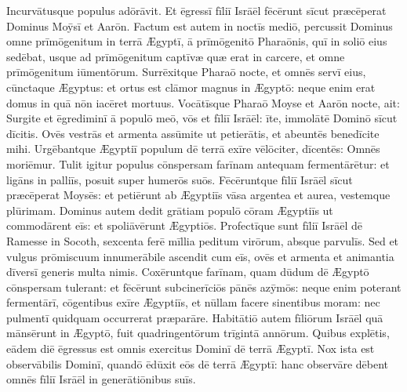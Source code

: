 Incurvātusque populus adōrāvit. Et ēgressī
fīliī Isrāēl fēcērunt sīcut præcēperat Dominus
Moȳsī et Aarōn. Factum est autem in noctīs mediō, percussit Dominus omne
prīmōgenitum in terrā Ægyptī, ā prīmōgenitō
Pharaōnis, quī in soliō eius sedēbat, usque ad prīmōgenitum
captīvæ quæ erat in carcere, et omne prīmōgenitum
iūmentōrum. Surrēxitque Pharaō nocte, et omnēs
servī eius, cūnctaque Ægyptus: et ortus est clāmor magnus in Ægyptō:
neque enim erat domus in quā nōn iacēret mortuus. Vocātīsque Pharaō
Moyse et Aarōn nocte, ait: Surgite et ēgrediminī ā populō
meō, vōs et fīliī Isrāēl: īte, immolātē Dominō sīcut dīcitis. Ovēs
vestrās et armenta assūmite ut petierātis, et abeuntēs
benedīcite mihi. Urgēbantque Ægyptiī
populum dē terrā exīre vēlōciter, dīcentēs: Omnēs moriēmur. Tulit
igitur populus cōnspersam farīnam antequam
fermentārētur: et ligāns in palliīs, posuit super
humerōs suōs. Fēcēruntque fīliī Isrāēl sīcut præcēperat
Moysēs: et petiērunt ab Ægyptiīs vāsa argentea et aurea, vestemque
plūrimam. Dominus autem dedit grātiam populō cōram Ægyptiīs ut
commodārent eīs: et spoliāvērunt Ægyptiōs. Profectīque sunt fīliī Isrāēl dē Ramesse
in Socoth, sexcenta ferē mīllia peditum virōrum, absque parvulīs. Sed et
vulgus prōmiscuum innumerābile ascendit cum eīs, ovēs et armenta et
animantia dīversī generis multa
nimis. Coxēruntque farīnam, quam dūdum dē Ægyptō
cōnspersam tulerant: et fēcērunt subcinerīciōs pānēs
azȳmōs: neque enim poterant fermentārī, cōgentibus exīre
Ægyptiīs, et nūllam facere sinentibus moram: nec pulmentī
quidquam occurrerat præparāre. Habitātiō
autem fīliōrum Isrāēl quā mānsērunt in Ægyptō, fuit quadringentōrum
trīgintā annōrum. Quibus explētis, eādem diē
ēgressus est omnis exercitus Dominī dē terrā Ægyptī. Nox ista est
observābilis Dominī, quandō ēdūxit eōs dē terrā Ægyptī: hanc
observāre dēbent omnēs fīliī Isrāēl in generātiōnibus suīs.
